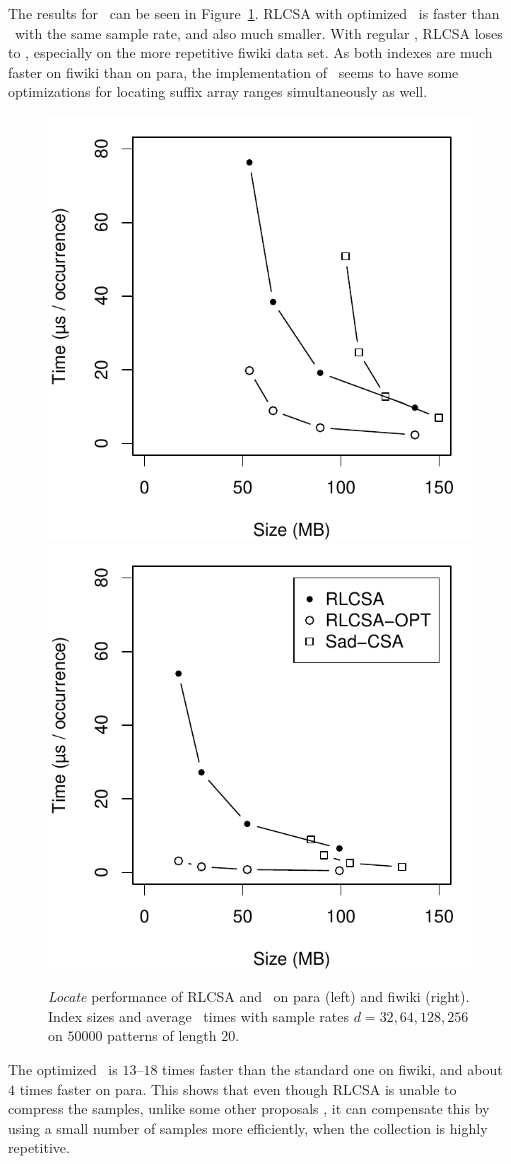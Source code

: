 The results for \locate\ can be seen in Figure~\ref{fig:rlcsa}. RLCSA with optimized \locate\ is faster than \sadcsa\ with the same sample rate, and also much smaller. With regular \locate, RLCSA loses to \sadcsa, especially on the more repetitive fiwiki data set. As both indexes are much faster on fiwiki than on para, the implementation of \sadcsa\ seems to have some optimizations for locating suffix array ranges simultaneously as well.

\begin{figure}
\centerline{
\includegraphics[width=.45\textwidth]{experiments/rlcsa/locate_para.pdf}
\hspace{5pt}
\includegraphics[width=.45\textwidth]{experiments/rlcsa/locate_fiwiki.pdf}
}

\caption{\emph{Locate} performance of RLCSA and \sadcsa\ on para (left) and fiwiki (right). Index sizes and average \locate\ times with sample rates $d = 32, 64, 128, 256$ on $50000$ patterns of length $20$.}\label{fig:rlcsa}
\end{figure}

The optimized \locate\ is $13$--$18$ times faster than the standard one on fiwiki, and about $4$ times faster on para. This shows that even though RLCSA is unable to compress the samples, unlike some other proposals \cite{Maekinen2010,Huang2010}, it can compensate this by using a small number of samples more efficiently, when the collection is highly repetitive.

